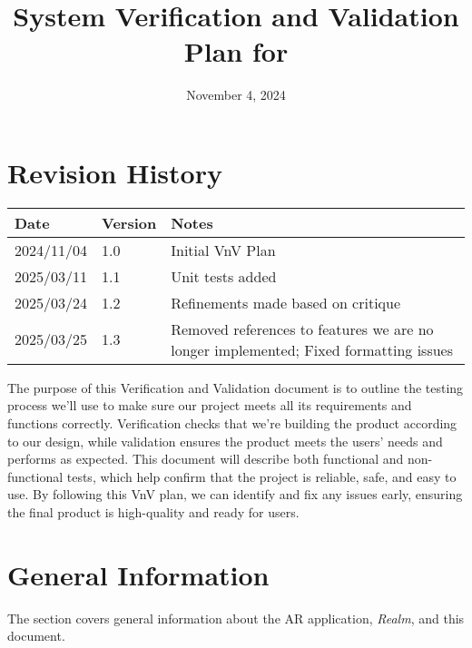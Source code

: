 \documentclass[12pt, titlepage]{article}
\begin{document}
\title{System Verification and Validation Plan for \progname{}}
\author{\authname}
\date{November 4, 2024}

\maketitle


\section*{Revision History}

\begin{tabularx}{\textwidth}{p{3cm}p{2cm}X}
  \toprule {\bf Date} & {\bf Version} & {\bf Notes}      \\
  \midrule
  2024/11/04          & 1.0           & Initial VnV Plan \\
  \midrule
  2025/03/11          & 1.1           & Unit tests added \\
  \midrule
  2025/03/24          & 1.2           & Refinements made based on critique \\
  \midrule
  2025/03/25          & 1.3           & Removed references to features we are no longer implemented; Fixed formatting issues \\
  \bottomrule
\end{tabularx}

\newpage

\tableofcontents

\listoftables

\newpage


The purpose of this Verification and Validation document is to outline the testing process we'll use to make sure our project meets all its requirements and functions correctly. Verification checks that we're building the product according to our design, while validation ensures the product meets the users' needs and performs as expected. This document will describe both functional and non-functional tests, which help confirm that the project is reliable, safe, and easy to use. By following this VnV plan, we can identify and fix any issues early, ensuring the final product is high-quality and ready for users.

\section{General Information}
The section covers general information about the AR application, \textit{Realm}, and this document.
\end{document}
